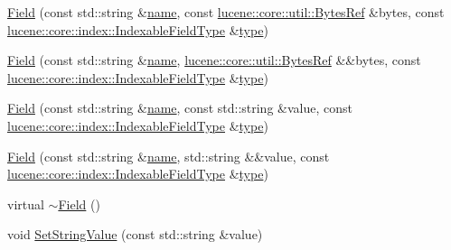 \begin{DoxyCompactItemize}
\item 
\mbox{\hyperlink{classlucene_1_1core_1_1document_1_1Field_a81d67b7915b9acd40aa3f69393dd3aae}{Field}} (const std\+::string \&\mbox{\hyperlink{classlucene_1_1core_1_1document_1_1Field_a550ee69f8cb7db2a00f3e9bda4964dfb}{name}}, const \mbox{\hyperlink{classlucene_1_1core_1_1util_1_1BytesRef}{lucene\+::core\+::util\+::\+Bytes\+Ref}} \&bytes, const \mbox{\hyperlink{classlucene_1_1core_1_1index_1_1IndexableFieldType}{lucene\+::core\+::index\+::\+Indexable\+Field\+Type}} \&\mbox{\hyperlink{classlucene_1_1core_1_1document_1_1Field_ad627895c156c58f9bd409caf06edbdf4}{type}})
\item 
\mbox{\hyperlink{classlucene_1_1core_1_1document_1_1Field_ae79a86d35c2adadb3a4f37db5f2ad042}{Field}} (const std\+::string \&\mbox{\hyperlink{classlucene_1_1core_1_1document_1_1Field_a550ee69f8cb7db2a00f3e9bda4964dfb}{name}}, \mbox{\hyperlink{classlucene_1_1core_1_1util_1_1BytesRef}{lucene\+::core\+::util\+::\+Bytes\+Ref}} \&\&bytes, const \mbox{\hyperlink{classlucene_1_1core_1_1index_1_1IndexableFieldType}{lucene\+::core\+::index\+::\+Indexable\+Field\+Type}} \&\mbox{\hyperlink{classlucene_1_1core_1_1document_1_1Field_ad627895c156c58f9bd409caf06edbdf4}{type}})
\item 
\mbox{\hyperlink{classlucene_1_1core_1_1document_1_1Field_a121d5f14b1ba85e7a3516ddc802b9cbc}{Field}} (const std\+::string \&\mbox{\hyperlink{classlucene_1_1core_1_1document_1_1Field_a550ee69f8cb7db2a00f3e9bda4964dfb}{name}}, const std\+::string \&value, const \mbox{\hyperlink{classlucene_1_1core_1_1index_1_1IndexableFieldType}{lucene\+::core\+::index\+::\+Indexable\+Field\+Type}} \&\mbox{\hyperlink{classlucene_1_1core_1_1document_1_1Field_ad627895c156c58f9bd409caf06edbdf4}{type}})
\item 
\mbox{\hyperlink{classlucene_1_1core_1_1document_1_1Field_a363f19e2884d2adce1b4d694018f2795}{Field}} (const std\+::string \&\mbox{\hyperlink{classlucene_1_1core_1_1document_1_1Field_a550ee69f8cb7db2a00f3e9bda4964dfb}{name}}, std\+::string \&\&value, const \mbox{\hyperlink{classlucene_1_1core_1_1index_1_1IndexableFieldType}{lucene\+::core\+::index\+::\+Indexable\+Field\+Type}} \&\mbox{\hyperlink{classlucene_1_1core_1_1document_1_1Field_ad627895c156c58f9bd409caf06edbdf4}{type}})
\item 
virtual \mbox{\hyperlink{classlucene_1_1core_1_1document_1_1Field_a45d6e6d09b8f8e46de62b40119d62c60}{$\sim$\+Field}} ()
\item 
void \mbox{\hyperlink{classlucene_1_1core_1_1document_1_1Field_a2bb6efa252c30c12aceef0db6e216ef9}{Set\+String\+Value}} (const std\+::string \&value)

\end{DoxyCompactItemize}
